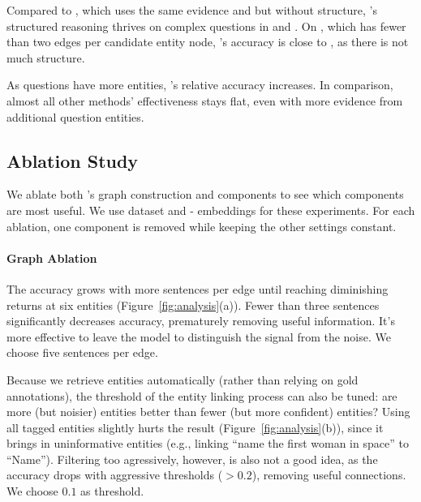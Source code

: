 Compared to \memnn{}, which uses the same evidence and \bert{} but
without structure, \name{}'s structured reasoning thrives on complex
questions in \qblink{} and \qanta{}.
%
On \triviaqa{}, which has fewer than two edges per candidate entity
node, \name{}'s accuracy is close to \memnn{}, as there is not much
structure.

As questions have more entities, \name{}'s relative accuracy
increases. In comparison, almost all other methods' effectiveness
stays flat, even with more evidence from additional question entities.







 

\subsection{Ablation Study}

We ablate both \name{}'s graph construction and  components
to see which components are most useful.
%
We use \qblink{} dataset and \name{}-\glove{} embeddings for these
experiments.
%
For each ablation, one component is removed while keeping the other
settings constant.



\paragraph{Graph Ablation} 

The accuracy grows with more sentences per edge until reaching
diminishing returns at six entities (Figure~\ref{fig:analysis}(a)).
%
Fewer than three sentences significantly decreases
 accuracy, prematurely removing useful information.
%
It's more effective to leave the  model to distinguish the
signal from the noise.
%
We choose five sentences per edge.

Because we retrieve entities automatically (rather than relying on gold
annotations), the threshold of the entity linking process can also be tuned: are more (but noisier) entities better than fewer (but more confident) entities?
%
Using all tagged entities slightly hurts the result
(Figure~\ref{fig:analysis}(b)), since it brings in uninformative
entities (e.g., linking ``name the first woman in space'' to
``Name'').
%
Filtering too agressively, however, is also not a good idea, as the
accuracy drops with aggressive thresholds ($>0.2$), removing useful
connections. We choose $0.1$ as threshold.


